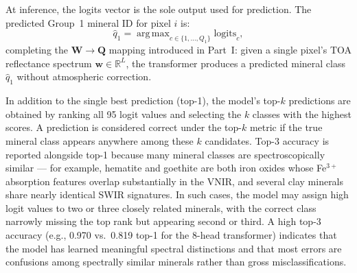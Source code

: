 \documentclass[11pt]{report}
\DeclareMathOperator{\argmax}{arg\,max}
\newcommand{\R}{\mathbb{R}}
\begin{document}
At inference, the logits vector is the sole output used for prediction. The predicted Group~1 mineral ID for pixel $i$ is:
\begin{equation}
\hat{q}_{1} = \argmax_{c \in \{1, \ldots, Q_1\}} \text{logits}_c,
\label{eq:prediction}
\end{equation}
completing the $\mathbf{W} \rightarrow \mathbf{Q}$ mapping introduced in Part~I: given a single pixel's TOA reflectance spectrum $\mathbf{w} \in \R^L$, the transformer produces a predicted mineral class $\hat{q}_{1}$ without atmospheric correction.

In addition to the single best prediction (top-1), the model's top-$k$ predictions are obtained by ranking all 95 logit values and selecting the $k$ classes with the highest scores. A prediction is considered correct under the top-$k$ metric if the true mineral class appears anywhere among these $k$ candidates. Top-3 accuracy is reported alongside top-1 because many mineral classes are spectroscopically similar --- for example, hematite and goethite are both iron oxides whose Fe$^{3+}$ absorption features overlap substantially in the VNIR, and several clay minerals share nearly identical SWIR signatures. In such cases, the model may assign high logit values to two or three closely related minerals, with the correct class narrowly missing the top rank but appearing second or third. A high top-3 accuracy (e.g., 0.970 vs.\ 0.819 top-1 for the 8-head transformer) indicates that the model has learned meaningful spectral distinctions and that most errors are confusions among spectrally similar minerals rather than gross misclassifications.
\end{document}
